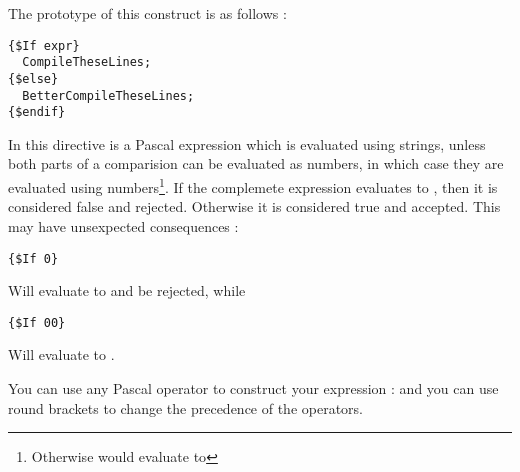 \documentclass{report}
\begin{document}
The prototype of this construct is as follows :
\begin{verbatim}
{$If expr}
  CompileTheseLines;
{$else}
  BetterCompileTheseLines;
{$endif}
\end{verbatim}
In this directive  is a Pascal expression which is evaluated using
strings, unless both parts of a comparision can be evaluated as numbers, 
in which case they are evaluated using numbers\footnote{Otherwise
 would evaluate to }.
If the complemete expression evaluates to , then it is considered 
false and rejected. Otherwise it is considered true and accepted. This may
have unsexpected consequences :
\begin{verbatim}
{$If 0}
\end{verbatim}
Will evaluate to  and be rejected, while
\begin{verbatim}
{$If 00}
\end{verbatim}
Will evaluate to .

You can use any Pascal operator to construct your expression :  and you can use round brackets to change the
precedence of the operators.
\end{document}
